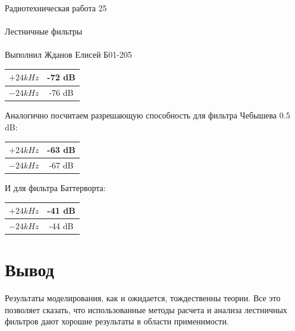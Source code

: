 \documentclass{astroedu-lab}
\begin{document}
\begin{problem}{\huge Радиотехническая работа 25\\\\Лестничные фильтры\\\\Выполнил Жданов Елисей Б01-205}
\begin{enumerate}
\begin{center}
\begin{tabular}{|c|c|}
\hline 
$+24 kHz$ & -72 dB \\ 
\hline 
$-24 kHz$ & -76 dB \\ 
\hline 
\end{tabular} 
\end{center}

Аналогично посчитаем разрешающую способность для фильтра Чебышева 0.5 dB:

\begin{center}
\begin{tabular}{|c|c|}
\hline 
$+24 kHz$ & -63 dB \\ 
\hline 
$-24 kHz$ & -67 dB \\ 
\hline 
\end{tabular} 
\end{center}

И для фильтра Баттерворта:

\begin{center}
\begin{tabular}{|c|c|}
\hline 
$+24 kHz$ & -41 dB \\ 
\hline 
$-24 kHz$ & -44 dB \\ 
\hline 
\end{tabular} 
\end{center}

\end{enumerate}


\section{Вывод}

Результаты моделирования, как и ожидается, тождественны теории. Все это позволяет сказать, что использованные методы расчета и анализа лестничных фильтров дают хорошие результаты в области применимости.


\end{problem}
\end{document}
